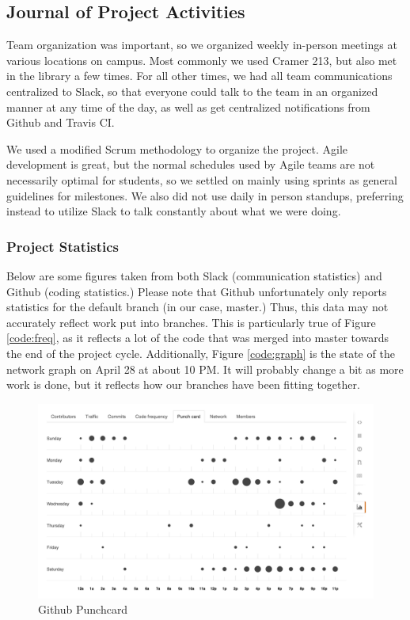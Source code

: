 \documentclass[12pt]{article}
\begin{document}
\subsection{Journal of Project Activities} %
Team organization was important, so we organized weekly in-person meetings at various locations on campus. Most commonly we used Cramer 213, but also met in the library a few times. For all other times, we had all team communications centralized to Slack, so that everyone could talk to the team in an organized manner at any time of the day, as well as get centralized notifications from Github and Travis CI.

We used a modified Scrum methodology to organize the project. Agile development is great, but the normal schedules used by Agile teams are not necessarily optimal for students, so we settled on mainly using sprints as general guidelines for milestones. We also did not use daily in person standups, preferring instead to utilize Slack to talk constantly about what we were doing.

\subsubsection{Project Statistics}
Below are some figures taken from both Slack (communication statistics) and Github (coding statistics.) Please note that Github unfortunately only reports statistics for the default branch (in our case, master.) Thus, this data may not accurately reflect work put into branches. This is particularly true of Figure \ref{code:freq}, as it reflects a lot of the code that was merged into master towards the end of the project cycle. Additionally, Figure \ref{code:graph} is the state of the network graph on April 28 at about 10 PM. It will probably change a bit as more work is done, but it reflects how our branches have been fitting together.

\begin{figure}[H]
        \centering
        \includegraphics[width=4.5in]{punchcard.png}
        \caption{Github Punchcard}
\end{figure}
\end{document}
